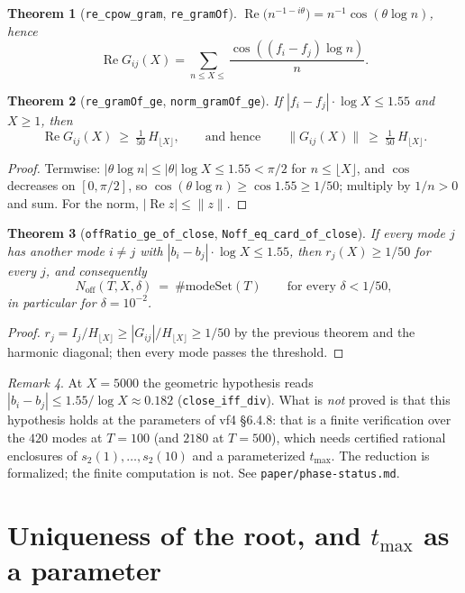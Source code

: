 \documentclass[11pt,a4paper]{article}
\newcommand{\lb}{\_\allowbreak}
\newcommand{\code}[1]{\texttt{#1}}
\newtheorem{theorem}{Theorem}[section]
\theoremstyle{definition}
\theoremstyle{remark}
\newtheorem{remark}[theorem]{Remark}
\begin{document}
\begin{theorem}[\code{re\lb cpow\lb gram}, \code{re\lb gramOf}]
$\operatorname{Re}\bigl(n^{-1-i\theta}\bigr) = n^{-1}\cos(\theta\log n)$, hence
\[
  \operatorname{Re}G_{ij}(X) = \sum_{n\le X\le}\frac{\cos((f_i-f_j)\log n)}{n}.
\]
\end{theorem}

\begin{theorem}[\code{re\lb gramOf\lb ge}, \code{norm\lb gramOf\lb ge}]
If $|f_i-f_j|\cdot\log X\le1.55$ and $X\ge1$, then
\[
  \operatorname{Re}G_{ij}(X)\ \ge\ \tfrac1{50}\,H_{\lfloor X\rfloor},
  \qquad\text{and hence}\qquad
  \|G_{ij}(X)\|\ \ge\ \tfrac1{50}\,H_{\lfloor X\rfloor}.
\]
\end{theorem}
\begin{proof}
Termwise: $|\theta\log n|\le|\theta|\log X\le1.55<\pi/2$ for $n\le\lfloor X\rfloor$, and $\cos$
decreases on $[0,\pi/2]$, so $\cos(\theta\log n)\ge\cos1.55\ge1/50$; multiply by $1/n>0$ and
sum.  For the norm, $|\operatorname{Re}z|\le\|z\|$.
\end{proof}

\begin{theorem}[\code{offRatio\lb ge\lb of\lb close}, \code{Noff\lb eq\lb card\lb of\lb close}]
If every mode $j$ has another mode $i\ne j$ with $|b_i-b_j|\cdot\log X\le1.55$, then
$r_j(X)\ge1/50$ for every $j$, and consequently
\[
  N_{\mathrm{off}}(T,X,\delta)\ =\ \#\mathrm{modeSet}(T)
  \qquad\text{for every } \delta<1/50,
\]
in particular for $\delta=10^{-2}$.
\end{theorem}
\begin{proof}
$r_j=I_j/H_{\lfloor X\rfloor}\ge|G_{ij}|/H_{\lfloor X\rfloor}\ge1/50$ by the previous theorem and
the harmonic diagonal; then every mode passes the threshold.
\end{proof}

\begin{remark}
At $X=5000$ the geometric hypothesis reads $|b_i-b_j|\le1.55/\log X\approx0.182$
(\code{close\lb iff\lb div}).  What is \emph{not} proved is that this hypothesis holds at the
parameters of vf4 \S6.4.8: that is a finite verification over the $420$ modes at $T=100$ (and
$2180$ at $T=500$), which needs certified rational enclosures of $s_2(1),\dots,s_2(10)$ and a
parameterized $t_{\max}$.  The reduction is formalized; the finite computation is not.  See
\code{paper/phase-status.md}.  \label{rem:status-s2}
\end{remark}


\section{Uniqueness of the root, and $t_{\max}$ as a parameter}\label{sec:unique}
\end{document}
